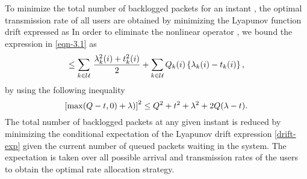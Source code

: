 To minimize the total number of backlogged packets for an instant , the optimal transmission rate of all users are obtained by minimizing the Lyapunov function drift expressed as  
\iftoggle{single_column}{
\begin{equation}\label{eqn-3.1}
\mathrm{L}\sset{\mbf{Q}(i+1)} - \mathrm{L}\sset{\mbf{Q}(i)} = \frac{1}{2} \Big [ \sum_{k \in \mc{U}} \, \Big ( \left [ Q_k(i) - t_k(i) \right ]^+ + \lambda_k(i) \Big )^2 - Q^2_k(i) \Big ].
\end{equation}}{
\begin{multline}\label{eqn-3.1}
\mathrm{L}\sset{\mbf{Q}(i+1)} - \mathrm{L}\sset{\mbf{Q}(i)} = \\ \frac{1}{2} \Big [ \sum_{k \in \mc{U}} \, \Big ( \left [ Q_k(i) - t_k(i) \right ]^+ + \lambda_k(i) \Big )^2 - Q^2_k(i) \Big ].
\end{multline}}
In order to eliminate the nonlinear operator \me{[x]^+}, we bound the expression in \eqref{eqn-3.1} as
\begin{equation}
\leq \sum_{k \in \mc{U}} \, \frac{\lambda^2_k(i) + t_k^2(i)}{2} + \sum_{k \in \mc{U}} Q_k(i) \set{ \lambda_k(i) - t_k(i) },
\label{drift-exp}
\end{equation}
by using the following inequality 
\begin{equation}
\left [ \max(Q-t,0) + \lambda) \right ]^2 \leq Q^2 + t^2 + \lambda^2 + 2 Q (\lambda - t).
\end{equation}
The total number of backlogged packets at any given instant  is reduced by minimizing the conditional expectation of the Lyapunov drift expression \eqref{drift-exp} given the current number of queued packets  waiting in the system. The expectation is taken over all possible arrival and transmission rates of the users to obtain the optimal rate allocation strategy. 

